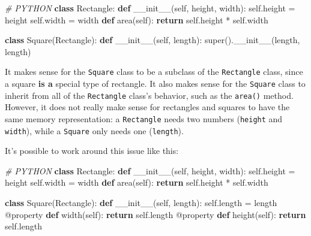 \documentclass[11pt]{article}
\newenvironment{Shaded}{}{}
\newcommand{\KeywordTok}[1]{\textcolor[rgb]{0.00,0.44,0.13}{\textbf{{#1}}}}
\newcommand{\CommentTok}[1]{\textcolor[rgb]{0.38,0.63,0.69}{\textit{{#1}}}}
\newcommand{\FunctionTok}[1]{\textcolor[rgb]{0.02,0.16,0.49}{{#1}}}
\newcommand{\NormalTok}[1]{{#1}}
\newcommand{\VariableTok}[1]{\textcolor[rgb]{0.10,0.09,0.49}{{#1}}}
\newcommand{\ControlFlowTok}[1]{\textcolor[rgb]{0.00,0.44,0.13}{\textbf{{#1}}}}
\newcommand{\OperatorTok}[1]{\textcolor[rgb]{0.40,0.40,0.40}{{#1}}}
\newcommand{\BuiltInTok}[1]{{#1}}
\newcommand{\AttributeTok}[1]{\textcolor[rgb]{0.49,0.56,0.16}{{#1}}}
\begin{document}
\begin{Shaded}
\begin{Highlighting}[]
\CommentTok{\# PYTHON}
\KeywordTok{class}\NormalTok{ Rectangle:}
    \KeywordTok{def} \FunctionTok{\_\_init\_\_}\NormalTok{(}\VariableTok{self}\NormalTok{, height, width):}
        \VariableTok{self}\NormalTok{.height }\OperatorTok{=}\NormalTok{ height}
        \VariableTok{self}\NormalTok{.width }\OperatorTok{=}\NormalTok{ width}
    \KeywordTok{def}\NormalTok{ area(}\VariableTok{self}\NormalTok{):}
        \ControlFlowTok{return} \VariableTok{self}\NormalTok{.height }\OperatorTok{*} \VariableTok{self}\NormalTok{.width}

\KeywordTok{class}\NormalTok{ Square(Rectangle):}
    \KeywordTok{def} \FunctionTok{\_\_init\_\_}\NormalTok{(}\VariableTok{self}\NormalTok{, length):}
        \BuiltInTok{super}\NormalTok{().}\FunctionTok{\_\_init\_\_}\NormalTok{(length, length)}
\end{Highlighting}
\end{Shaded}

It makes sense for the \texttt{Square} class to be a subclass of the
\texttt{Rectangle} class, since a square \textbf{is a} special type of
rectangle. It also makes sense for the \texttt{Square} class to inherit
from all of the \texttt{Rectangle} class's behavior, such as the
\texttt{area()} method. However, it does not really make sense for
rectangles and squares to have the same memory representation: a
\texttt{Rectangle} needs two numbers (\texttt{height} and
\texttt{width}), while a \texttt{Square} only needs one
(\texttt{length}).

It's possible to work around this issue like this:

\begin{Shaded}
\begin{Highlighting}[]
\CommentTok{\# PYTHON}
\KeywordTok{class}\NormalTok{ Rectangle:}
    \KeywordTok{def} \FunctionTok{\_\_init\_\_}\NormalTok{(}\VariableTok{self}\NormalTok{, height, width):}
        \VariableTok{self}\NormalTok{.height }\OperatorTok{=}\NormalTok{ height}
        \VariableTok{self}\NormalTok{.width }\OperatorTok{=}\NormalTok{ width}
    \KeywordTok{def}\NormalTok{ area(}\VariableTok{self}\NormalTok{):}
        \ControlFlowTok{return} \VariableTok{self}\NormalTok{.height }\OperatorTok{*} \VariableTok{self}\NormalTok{.width}

\KeywordTok{class}\NormalTok{ Square(Rectangle):}
    \KeywordTok{def} \FunctionTok{\_\_init\_\_}\NormalTok{(}\VariableTok{self}\NormalTok{, length):}
        \VariableTok{self}\NormalTok{.length }\OperatorTok{=}\NormalTok{ length}
    \AttributeTok{@property}
    \KeywordTok{def}\NormalTok{ width(}\VariableTok{self}\NormalTok{):}
        \ControlFlowTok{return} \VariableTok{self}\NormalTok{.length}
    \AttributeTok{@property}
    \KeywordTok{def}\NormalTok{ height(}\VariableTok{self}\NormalTok{):}
        \ControlFlowTok{return} \VariableTok{self}\NormalTok{.length}
\end{Highlighting}
\end{Shaded}
\end{document}
